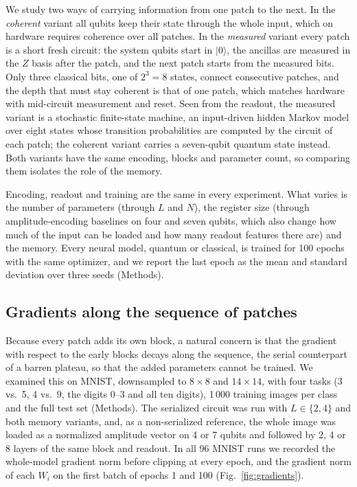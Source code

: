 \documentclass[11pt]{article}
\begin{document}
We study two ways of carrying information from one patch to the next. In the \emph{coherent} variant all qubits keep their state through the whole input, which on hardware requires coherence over all patches. In the \emph{measured} variant every patch is a short fresh circuit: the system qubits start in $\lvert0\rangle$, the ancillas are measured in the $Z$ basis after the patch, and the next patch starts from the measured bits. Only three classical bits, one of $2^3=8$ states, connect consecutive patches, and the depth that must stay coherent is that of one patch, which matches hardware with mid-circuit measurement and reset. Seen from the readout, the measured variant is a stochastic finite-state machine, an input-driven hidden Markov model over eight states whose transition probabilities are computed by the circuit of each patch; the coherent variant carries a seven-qubit quantum state instead. Both variants have the same encoding, blocks and parameter count, so comparing them isolates the role of the memory.

Encoding, readout and training are the same in every experiment. What varies is the number of parameters (through $L$ and $N$), the register size (through amplitude-encoding baselines on four and seven qubits, which also change how much of the input can be loaded and how many readout features there are) and the memory. Every neural model, quantum or classical, is trained for 100 epochs with the same optimizer, and we report the last epoch as the mean and standard deviation over three seeds (Methods).

\subsection{Gradients along the sequence of patches}
\label{sec:res-gradients}

Because every patch adds its own block, a natural concern is that the gradient with respect to the early blocks decays along the sequence, the serial counterpart of a barren plateau, so that the added parameters cannot be trained. We examined this on MNIST, downsampled to $8\times8$ and $14\times14$, with four tasks (3 vs.\ 5, 4 vs.\ 9, the digits 0--3 and all ten digits), 1\,000 training images per class and the full test set (Methods). The serialized circuit was run with $L\in\{2,4\}$ and both memory variants, and, as a non-serialized reference, the whole image was loaded as a normalized amplitude vector on 4 or 7 qubits and followed by 2, 4 or 8 layers of the same block and readout. In all 96 MNIST runs we recorded the whole-model gradient norm before clipping at every epoch, and the gradient norm of each $W_i$ on the first batch of epochs 1 and 100 (Fig.~\ref{fig:gradients}).
\end{document}
